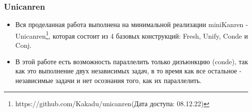 \documentclass{beamer}
\newtheorem{rutheorem}{Теорема}
\begin{document}




\begin{frame}
  \frametitle{Unicanren}
  \begin{itemize}
  \item Вся проделанная работа выполнена на минимальной реализации miniKanren - Unicanren\footnote{{https://github.com/Kakadu/unicanren}(Дата доступа: 08.12.22)}, которая состоит из 4 базовых конструкций: Fresh, Unify, Conde и Conj.
  \item В этой работе есть возможность параллелить только дизъюнкцию (conde), так как это выполнение двух независимых задач, в то время как все остальное - независимые задачи и нет осознания того, как их параллелить.
  
  \end{itemize}
  \end{frame}

\end{document}
